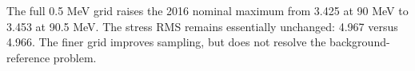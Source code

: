 The full 0.5 MeV grid raises the 2016 nominal maximum from 3.425 at 90 MeV to 3.453 at 90.5 MeV. The stress RMS remains essentially unchanged: 4.967 versus 4.966. The finer grid improves sampling, but does not resolve the background-reference problem.
